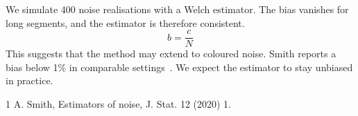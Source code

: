 \documentclass{article}
\begin{document}
We simulate 400 noise realisations with a Welch estimator.
The bias vanishes for long segments, and the estimator is therefore consistent.
\begin{equation}
  b = \frac{c}{N} \label{eq:bias}
\end{equation}
This suggests that the method may extend to coloured noise.
Smith reports a bias below 1\% in comparable settings~\cite{smith2020}.
We expect the estimator to stay unbiased in practice.
\begin{thebibliography}{1}
 A. Smith, Estimators of noise, J. Stat. 12 (2020) 1.
\end{thebibliography}
\end{document}
